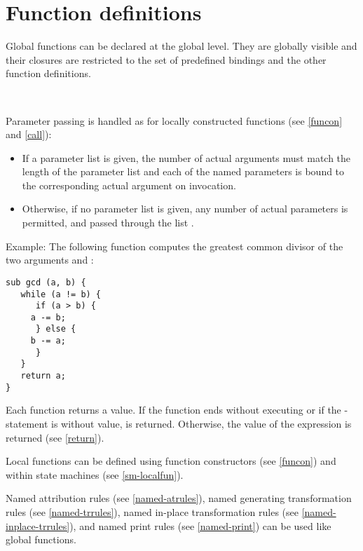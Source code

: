 \chapter{Function definitions}\label{functiondef}

Global functions can be declared at the global level. They are
globally visible and their closures are restricted
to the set of predefined bindings and the other function definitions.

\begin{grammar}
      \produces {}   \\
      \produces {} 
	  
\end{grammar}

\noindent
Parameter passing is handled as for locally constructed functions
(see \ref{funcon} and \ref{call}):

\begin{itemize}
   \item If a parameter list is given, the number of actual
      arguments must match the length of the parameter list
      and each of the named parameters is bound to the corresponding
      actual argument on invocation.
   \item Otherwise, if no parameter list is given, any number
      of actual parameters is permitted, and passed through
      the list .
\end{itemize}

Example: The following function computes the greatest common divisor
of the two arguments  and :

\begin{lstlisting}
sub gcd (a, b) {
   while (a != b) {
      if (a > b) {
	 a -= b;
      } else {
	 b -= a;
      }
   }
   return a;
}
\end{lstlisting}

Each function returns a value. If the function ends without
executing  or if the -statement
is without value,  is returned. Otherwise, the
value of the  expression is returned (see \ref{return}).

\noindent
Local functions can be defined using function constructors
(see \ref{funcon}) and within state machines (see \ref{sm-localfun}).

Named attribution rules (see \ref{named-atrules}),
named generating transformation rules (see \ref{named-trrules}),
named in-place transformation rules (see \ref{named-inplace-trrules}),
and named print rules (see \ref{named-print}) can be
used like global functions.

\endinput
